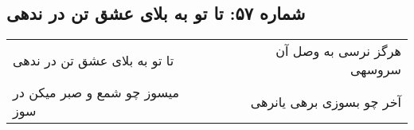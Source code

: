 \begin{center}
\section*{شماره ۵۷: تا تو به بلای عشق تن در ندهی}
\label{sec:057}
\begin{longtable}{l p{0.5cm} r}
تا تو به بلای عشق تن در ندهی
&&
هرگز نرسی به وصل آن سروسهی
\\
میسوز چو شمع و صبر میکن در سوز
&&
آخر چو بسوزی برهی یانرهی
\\
\end{longtable}
\end{center}

